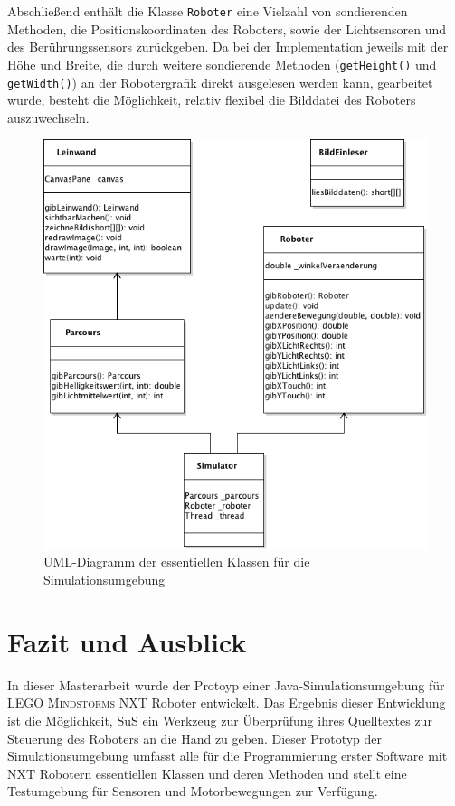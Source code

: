 \documentclass[paper=a4, pagesize, DIV=calc, BCOR=15.5mm, twoside=on, onecolumn=on, open = right, titlepage =on, parskip =half-, headsepline = on, footsepline = on, chapterprefix = on, appendixprefix = off, fontsize = 12pt, numbers = noenddot, abstract = on]{scrbook}
\numberwithin{equation}{chapter}
\theoremstyle{definition}
\theoremstyle{plain}
\theoremstyle{plain}
\theoremstyle{remark}
\theoremstyle{plain}
\theoremstyle{plain}
\begin{document}
Abschließend enthält die Klasse \texttt{Roboter} eine Vielzahl von sondierenden Methoden, die Positionskoordinaten des Roboters, sowie der Lichtsensoren und des Berührungssensors zurückgeben. Da bei der Implementation jeweils mit der Höhe und Breite, die durch weitere sondierende Methoden (\texttt{getHeight()} und \texttt{getWidth()}) an der Robotergrafik direkt ausgelesen werden kann, gearbeitet wurde, besteht die Möglichkeit, relativ flexibel die Bilddatei des Roboters auszuwechseln.

\begin{figure}[htbp]
\centering
\includegraphics[scale=0.7]{images/uml_simulator_essenz.png}
\caption{UML-Diagramm der essentiellen Klassen für die Simulationsumgebung}
\label{fig:simulator_uml}
\end{figure}


\newpage
\chapter{Fazit und Ausblick}

\onehalfspacing

In dieser Masterarbeit wurde der Protoyp einer Java-Simulationsumgebung für \textsc{LEGO Mindstorms} NXT Roboter entwickelt. Das Ergebnis dieser Entwicklung ist die Möglichkeit, SuS ein Werkzeug zur Überprüfung ihres Quelltextes zur Steuerung des Roboters an die Hand
zu geben. Dieser Prototyp der Simulationsumgebung umfasst alle für die
Programmierung erster Software mit NXT Robotern essentiellen Klassen und deren Methoden und stellt eine Testumgebung für Sensoren und Motorbewegungen zur Verfügung.
\end{document}
